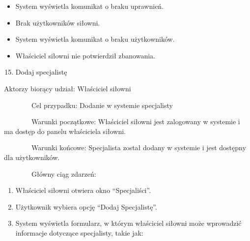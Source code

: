 \documentclass[
]{article}
\providecommand{\tightlist}{%
  \setlength{\itemsep}{0pt}\setlength{\parskip}{0pt}}
\begin{document}
\begin{itemize}
\tightlist
\item
  {System wyświetla komunikat o braku uprawnień.}
\end{itemize}

\begin{itemize}
\tightlist
\item
  {Brak użytkowników siłowni.}
\end{itemize}

\begin{itemize}
\tightlist
\item
  {System wyświetla komunikat o braku użytkowników.}
\end{itemize}

\begin{itemize}
\tightlist
\item
  {Właściciel siłowni nie potwierdził zbanowania.\\
  }
\end{itemize}

{}

{}

{}

{}

{}

{}

{}

\begin{enumerate}
\setcounter{enumi}{14}
\tightlist
\item
  {Dodaj specjalistę}
\end{enumerate}

{Aktorzy biorący udział: Właściciel siłowni}

{~~~~~~~~Cel przypadku: Dodanie w systemie specjalisty}

{~~~~~~~~Warunki początkowe: Właściciel siłowni jest zalogowany w
systemie i ma dostęp do panelu właściciela siłowni.}

{~~~~~~~~Warunki końcowe: Specjalista został dodany w systemie i jest
dostępny dla użytkowników.}

{~~~~~~~~Główny ciąg zdarzeń:}

\begin{enumerate}
\tightlist
\item
  {Właściciel siłowni otwiera okno ``Specjaliści''.}
\item
  {Użytkownik wybiera opcję ``Dodaj Specjalistę''.}
\item
  {System wyświetla formularz, w którym właściciel siłowni może
  wprowadzić informacje dotyczące specjalisty, takie jak:}
\end{enumerate}
\end{document}
